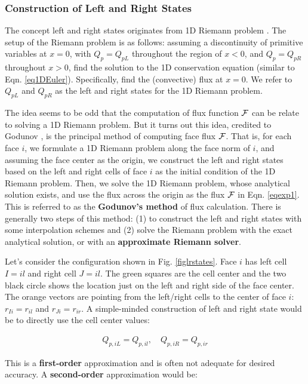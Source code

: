 \documentclass[12pt, letterpaper]{report}
\begin{document}
\subsubsection{Construction of Left and Right States}

The concept left and right states originates from 1D Riemann problem \cite{toro2013riemann}. The
setup of the Riemann problem is as follows: assuming a discontinuity of primitive variables at $x =
0$, with $Q_p = Q_{pL}$ throughout the region of $x < 0$, and $Q_p = Q_{pR}$ throughout $x > 0$,
find the solution to the 1D conservation equation (similar to Eqn.  \ref{eq1DEuler}).
Specifically, find the (convective) flux at $x = 0$. We refer to $Q_{pL}$ and $Q_{pR}$ as the left
and right states for the 1D Riemann problem. \paraspace

The idea seems to be odd that the computation of flux function $\mathcal{F}$ can be relate to solving a 1D
Riemann problem. But it turns out this idea, credited to Godunov \cite{toro2013riemann}, is the
principal method of computing face flux $\mathcal{F}$. That is, for each face $i$, we formulate a 1D Riemann
problem along the face norm of $i$, and assuming the face center as the origin, we construct the
left and right states based on the left and right cells of face $i$ as the initial condition of the
1D Riemann problem. Then, we solve the 1D Riemann problem, whose analytical solution exists, and use
the flux across the origin as the flux $\mathcal{F}$ in Eqn. \ref{eqexp1}. This is referred to as the {\bf
Godunov's method} of flux calculation. There is generally two steps of this method: (1) to construct
the left and right states with some interpolation schemes and (2) solve the Riemann problem with the
exact analytical solution, or with an {\bf approximate Riemann solver}. \paraspace

Let's consider the configuration shown in Fig. \ref{figlrstates}. Face $i$ has left cell $I = il$
and right cell $J = il$. The green squares are the cell center and the two black circle shows the
location just on the left and right side of the face center. The orange vectors are pointing from
the left/right cells to the center of face $i$: $r_{Ii} = r_{il}$ and $r_{Ji} = r_{ir}$. A
simple-minded construction of left and right state would be to directly use the cell center values:

\begin{align*}
   Q_{p,iL} = Q_{p,il}, \quad Q_{p,iR} = Q_{p,ir}
\end{align*}

This is a {\bf first-order} approximation and is often not adequate for desired accuracy. A {\bf
second-order} approximation would be:
\end{document}
